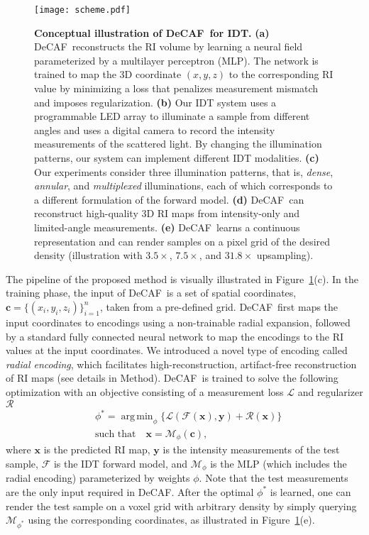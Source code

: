 \documentclass[11pt]{article}
\theoremstyle{plain} %
\def\argmin{\mathop{\mathrm{arg\,min}}} %
\def\proposed{DeCAF}
\def\cbm{{\bm{c}}}
\def\xbm{{\bm{x}}}
\def\ybm{{\bm{y}}}
\def\Mcal{{\mathcal{M}}}
\def\Lcal{{\mathcal{L}}}
\def\Fcal{{\mathcal{F}}}
\def\Rcal{{\mathcal{R}}}
\begin{document}
\begin{figure}[t!]
\begin{center}
\texttt{[image: scheme.pdf]}
\end{center}
\caption{
\textbf{Conceptual illustration of \proposed~for IDT.}
\textbf{(a)} \proposed~reconstructs the RI volume by learning a neural field parameterized by a multilayer perceptron (MLP). The network is trained to map the 3D coordinate $(x,y,z)$ to the corresponding RI value by minimizing a loss that penalizes measurement mismatch and imposes regularization.
\textbf{(b)} Our IDT system uses a programmable LED array to illuminate a sample from different angles and uses a digital camera to record the intensity measurements of the scattered light. By changing the illumination patterns, our system can implement different IDT modalities. 
\textbf{(c)} Our experiments consider three illumination patterns, that is, \emph{dense}, \emph{annular}, and \emph{multiplexed} illuminations, each of which corresponds to a different formulation of the forward model. 
\textbf{(d)} \proposed~can reconstruct high-quality 3D RI maps from intensity-only and limited-angle measurements. \textbf{(e)} \proposed~learns a continuous representation and can render samples on a pixel grid of the desired density (illustration with $3.5\times$, $7.5\times$, and $31.8\times$ upsampling).
}
\label{Fig:scheme}
\end{figure}

The pipeline of the proposed method is visually illustrated in Figure~\ref{Fig:scheme}(c). In the training phase, the input of \proposed~is a set of spatial coordinates, $\cbm=\{(x_i,y_i,z_i)\}_{i=1}^n$, taken from a pre-defined grid.
\proposed~first maps the input coordinates to encodings using a non-trainable radial expansion, followed by a standard fully connected neural network to map the encodings to the RI values at the input coordinates. We introduced a novel type of encoding called \emph{radial encoding}, which facilitates high-reconstruction, artifact-free reconstruction of RI maps (see details in Method). 
\proposed~is trained to solve the following optimization with an objective consisting of a measurement loss $\Lcal$ and regularizer $\Rcal$
\begin{align}
\label{Eq:Loss}
&\phi^\ast = \argmin_\phi\{\Lcal(\Fcal(\xbm), \ybm) + \mathcal{R}(\xbm)\} \nonumber\\
&\text{such that}\quad\xbm = \mathcal{M}_\phi(\cbm),
\end{align}
where $\xbm$ is the predicted RI map, $\ybm$ is the intensity measurements of the test sample, $\Fcal$ is the IDT forward model, and $\Mcal_\phi$ is the MLP (which includes the radial encoding) parameterized by weights $\phi$. 
Note that the test measurements are the only input required in  \proposed.
After the optimal $\phi^\ast$ is learned, one can render the test sample on a voxel grid with arbitrary density by simply querying $\Mcal_{\phi^\ast}$ using the corresponding coordinates, as illustrated in Figure~\ref{Fig:scheme}(e).
\end{document}
